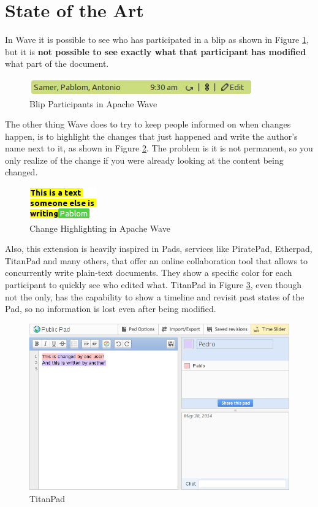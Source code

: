\section{State of the Art}
\label{subsec:color_soa}
In Wave it is possible to see who has participated in a blip as shown in Figure \ref{fig:participants}, but it is \textbf{not possible to see exactly what that participant has modified} what part of the document.
\begin{figure}[H]
  \center
    \includegraphics[keepaspectratio, scale=0.7]{Media/Captures/Wave/Participants.png}
  \caption{Blip Participants in Apache Wave}
  \label{fig:participants}
\end{figure}
The other thing Wave does to try to keep people informed on when changes happen, is to highlight the changes that just happened and write the author's name next to it, as shown in Figure \ref{fig:participants2}. The problem is it is not permanent, so you only realize of the change if you were already looking at the content being changed.
\begin{figure}[H]
  \center
    \includegraphics[keepaspectratio, scale=0.7]{Media/Captures/Wave/Participants2.png}
  \caption{Change Highlighting in Apache Wave}
  \label{fig:participants2}
\end{figure}
Also, this extension is heavily inspired in Pads, services like PiratePad, Etherpad, TitanPad and many others, that offer an online collaboration tool that allows to concurrently write plain-text documents. They show a specific color for each participant to quickly see who edited what. TitanPad in Figure \ref{fig:titanpad}, even though not the only, has the capability to show a timeline and revisit past states of the Pad, so no information is lost even after being modified.
\begin{figure}[h]
  \center
    \includegraphics[keepaspectratio, scale=0.4]{Media/Captures/Soa/TitanPad.png}
  \caption{TitanPad}
  \label{fig:titanpad}
\end{figure}


